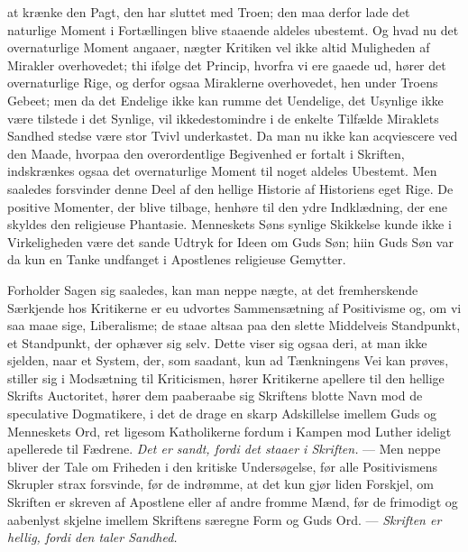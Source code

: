 \documentclass[12pt]{book}
\newcommand{\opage}[1]{\marginnote{\footnotesize\textit{[#1]}}}
\begin{document}
at krænke den Pagt, den har sluttet med Troen; den maa derfor lade det
naturlige Moment i Fortællingen blive staaende aldeles ubestemt. Og hvad nu
det overnaturlige Moment angaaer, nægter Kritiken vel ikke altid Muligheden af
Mirakler overhovedet; thi ifølge det Princip, hvorfra vi ere gaaede ud, hører
det overnaturlige Rige, og derfor ogsaa Miraklerne overhovedet, hen under
Troens Gebeet; men da det Endelige ikke kan rumme det Uendelige, det Usynlige
ikke være tilstede i det Synlige, vil ikkedestomindre i de enkelte Tilfælde
Miraklets Sandhed stedse være stor Tvivl underkastet. Da man nu ikke kan
acqviescere ved den Maade, hvorpaa den overordentlige Begivenhed er fortalt i
Skriften, indskrænkes ogsaa det overnaturlige Moment til noget aldeles
Ubestemt. Men saaledes forsvinder denne Deel af den hellige Historie af
Historiens eget Rige. De positive Momenter, der blive tilbage, henhøre til den
ydre Indklædning, der ene skyldes den religieuse Phantasie. Menneskets Søns
synlige Skikkelse
\opage{118} kunde ikke i Virkeligheden være det sande Udtryk for Ideen om Guds Søn; hiin
Guds Søn var da kun en Tanke undfanget i Apostlenes religieuse Gemytter.

Forholder Sagen sig saaledes, kan man neppe nægte, at det fremherskende
Særkjende hos Kritikerne er eu udvortes Sammensætning af Positivisme og, om vi
saa maae sige, Liberalisme; de staae altsaa paa den slette Middelveis
Standpunkt, et Standpunkt, der ophæver sig selv. Dette viser sig ogsaa deri,
at man ikke sjelden, naar et System, der, som saadant, kun ad Tænkningens Vei
kan prøves, stiller sig i Modsætning til Kriticismen, hører Kritikerne
apellere til den hellige Skrifts Auctoritet, hører dem paaberaabe sig
Skriftens blotte Navn mod de speculative Dogmatikere, i det de drage en skarp
Adskillelse imellem Guds og Menneskets Ord, ret ligesom Katholikerne fordum i
Kampen mod Luther ideligt apellerede til Fædrene. \emph{Det er sandt, fordi
det staaer i Skriften.} --- Men neppe bliver der Tale om Friheden i den
kritiske Undersøgelse, før alle Positivismens Skrupler strax forsvinde, før de
indrømme, at det kun gjør liden Forskjel, om Skriften er skreven af Apostlene
eller af andre fromme Mænd, før de frimodigt og aabenlyst skjelne imellem
Skriftens særegne Form og Guds Ord. --- \emph{Skriften er hellig, fordi den
taler Sandhed.}
\end{document}
